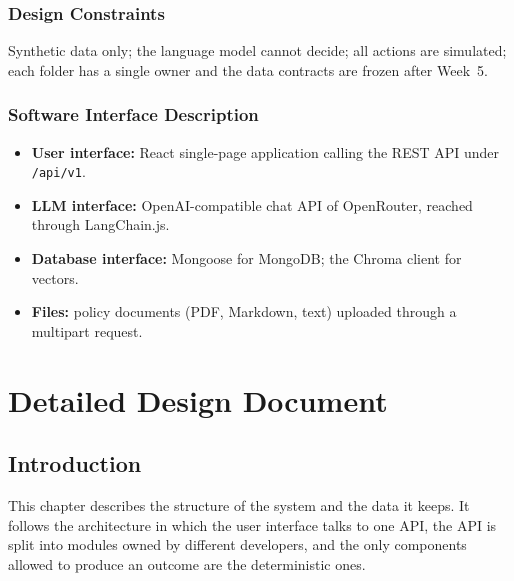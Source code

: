 \documentclass[oneside,a4paper,12pt]{report}
\begin{document}
\subsection{Design Constraints}
Synthetic data only; the language model cannot decide; all actions are simulated; each folder has a single owner and the data contracts are frozen after Week~5.

\subsection{Software Interface Description}
\begin{itemize}
  \item \textbf{User interface:} React single-page application calling the REST API under \texttt{/api/v1}.
  \item \textbf{LLM interface:} OpenAI-compatible chat API of OpenRouter, reached through LangChain.js.
  \item \textbf{Database interface:} Mongoose for MongoDB; the Chroma client for vectors.
  \item \textbf{Files:} policy documents (PDF, Markdown, text) uploaded through a multipart request.
\end{itemize}

\chapter{Detailed Design Document}

\section{Introduction}
This chapter describes the structure of the system and the data it keeps. It follows the architecture in which the user interface talks to one API, the API is split into modules owned by different developers, and the only components allowed to produce an outcome are the deterministic ones.
\end{document}
